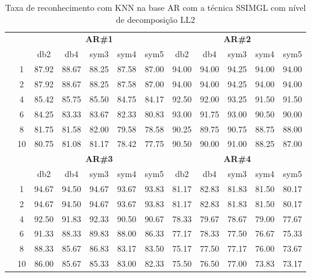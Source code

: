 \begin{table}[H]
	\centering
    \normalsize
	\caption{Taxa de reconhecimento com KNN na base AR com a técnica SSIMGL com nível de decomposição LL2}
	\begin{tabular}{|c|c|c c c c c|c c c c c|}
\cline{3-12}
\multicolumn{2}{c|}{\multirow{2}{*}{}} & \multicolumn{5}{c|}{\textbf{AR\#1}}  & \multicolumn{5}{c|}{\textbf{AR\#2}} \\\cline{3-12}

\multicolumn{2}{c|}{}  & db2 & db4 & sym3 & sym4 & sym5 & db2 & db4& sym3 & sym4 & sym5 \\\hline

\multicolumn{1}{|c|}{ \multirow{5}{*}{\rotatebox[origin=c]{90}{\textbf{K-vizinhos}}} }
&1	&87.92	&88.67	&88.25	&87.58	&87.00	&94.00	&94.00	&94.25 &94.00&	94.00 \\\cline{2-12}
&2	&87.92	&88.67	&88.25	&87.58	&87.00	&94.00	&94.00	&94.25 &94.00&	94.00 \\\cline{2-12}
&4	&85.42	&85.75	&85.50	&84.75	&84.17	&92.50	&92.00	&93.25 &91.50&	91.50 \\\cline{2-12}
&6	&84.25	&83.33	&83.67	&82.33	&80.83	&93.00	&91.75	&93.00 &90.50&	90.00 \\\cline{2-12}
&8	&81.75	&81.58	&82.00	&79.58	&78.58	&90.25	&89.75	&90.75 &88.75&	88.00 \\\cline{2-12}
&10	&80.75	&81.08	&81.17	&78.42	&77.75	&90.50	&90.00	&91.00 &88.25&	87.00 %

\\\midrule




\cline{3-12}
\multicolumn{2}{c}{} & \multicolumn{5}{|c|}{\textbf{AR\#3}}  & \multicolumn{5}{c|}{\textbf{AR\#4}} \\\cline{3-12}
\multicolumn{2}{c}{}  & \multicolumn{1}{|c}{db2} & db4 & sym3 & sym4 & sym5 & db2 & db4& sym3 & sym4 & sym5 \\\hline

\multicolumn{1}{|c|}{ \multirow{6}{*}{\rotatebox[origin=c]{90}{\textbf{K-vizinhos}}} }
&1	&94.67	&94.50	&94.67	&93.67	&93.83	&81.17	&82.83	&81.83	&81.50	&80.17\\\cline{2-12}
&2	&94.67	&94.50	&94.67	&93.67	&93.83	&81.17	&82.83	&81.83	&81.50	&80.17\\\cline{2-12}
&4	&92.50	&91.83	&92.33	&90.50	&90.67	&78.33	&79.67	&78.67	&79.00	&77.67\\\cline{2-12}
&6	&91.33	&88.33	&89.83	&88.00	&86.33	&77.17	&78.33	&77.50	&76.67	&75.33\\\cline{2-12}
&8	&88.33	&85.67	&86.83	&83.17	&83.50	&75.17	&77.50	&77.17	&76.00	&73.67\\\cline{2-12}
&10	&86.00	&85.67	&85.33	&83.00	&82.33	&75.50	&76.50	&77.00	&73.83	&73.17%


\end{tabular}
\end{table}
